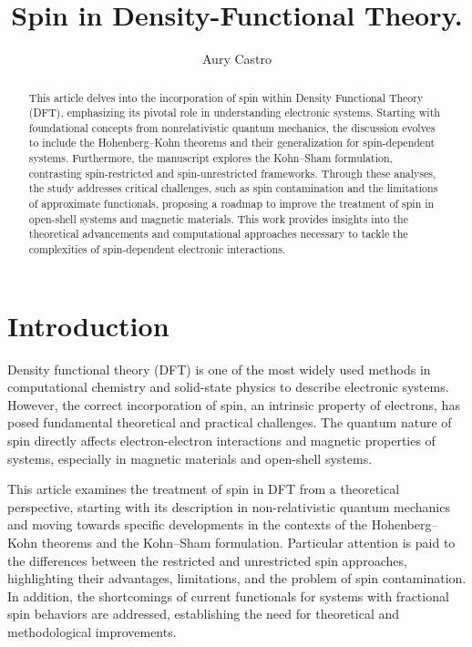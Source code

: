 \documentclass[%
 preprint, linenumbers,
 amsmath,amssymb,
 aps, physrev,
]{revtex4-2}
\begin{document}

\title{\textbf{ Spin in Density-Functional Theory.} 
}%


 
\author{Aury Castro}



\begin{abstract}
 This article delves into the incorporation of spin within Density Functional Theory (DFT), emphasizing its pivotal role in understanding electronic systems. Starting with foundational concepts from nonrelativistic quantum mechanics, the discussion evolves to include the Hohenberg–Kohn theorems and their generalization for spin-dependent systems. Furthermore, the manuscript explores the Kohn–Sham formulation, contrasting spin-restricted and spin-unrestricted frameworks. Through these analyses, the study addresses critical challenges, such as spin contamination and the limitations of approximate functionals, proposing a roadmap to improve the treatment of spin in open-shell systems and magnetic materials. This work provides insights into the theoretical advancements and computational approaches necessary to tackle the complexities of spin-dependent electronic interactions.
\end{abstract}

\maketitle


\section{Introduction}
Density functional theory (DFT) is one of the most widely used methods in computational chemistry and solid-state physics to describe electronic systems. However, the correct incorporation of spin, an intrinsic property of electrons, has posed fundamental theoretical and practical challenges. The quantum nature of spin directly affects electron-electron interactions and magnetic properties of systems, especially in magnetic materials and open-shell systems.

This article examines the treatment of spin in DFT from a theoretical perspective, starting with its description in non-relativistic quantum mechanics and moving towards specific developments in the contexts of the Hohenberg–Kohn theorems and the Kohn–Sham formulation. Particular attention is paid to the differences between the restricted and unrestricted spin approaches, highlighting their advantages, limitations, and the problem of spin contamination. In addition, the shortcomings of current functionals for systems with fractional spin behaviors are addressed, establishing the need for theoretical and methodological improvements.
\end{document}
